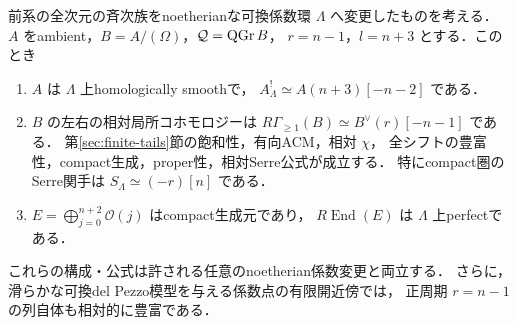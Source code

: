 \begin{theorem}\label{thm:elliptic-relative-tails}
前系の全次元の斉次族をnoetherianな可換係数環 $\Lambda$ へ変更したものを考える．
$A$ をambient，$B=A/(\Omega)$，$\mathcal Q=\operatorname{QGr} B$，
$r=n-1$，$l=n+3$ とする．このとき
\begin{enumerate}
 \item $A$ は $\Lambda$ 上homologically smoothで，
       $A^!_\Lambda\simeq A(n+3)[-n-2]$ である．
 \item $B$ の左右の相対局所コホモロジーは
       $R\Gamma_{\ge1}(B)\simeq B^\vee(r)[-n-1]$ である．
       第\ref{sec:finite-tails}節の飽和性，有向ACM，相対 $\chi$，
       全シフトの豊富性，compact生成，proper性，相対Serre公式が成立する．
       特にcompact圏のSerre関手は $S_\Lambda\simeq(-r)[n]$ である．
 \item $E=\bigoplus_{j=0}^{n+2}\mathcal O(j)$ はcompact生成元であり，
       $R\!\operatorname{End}(E)$ は $\Lambda$ 上perfectである．
\end{enumerate}
これらの構成・公式は許される任意のnoetherian係数変更と両立する．
さらに，滑らかな可換del Pezzo模型を与える係数点の有限開近傍では，
正周期 $r=n-1$ の列自体も相対的に豊富である．
\end{theorem}
